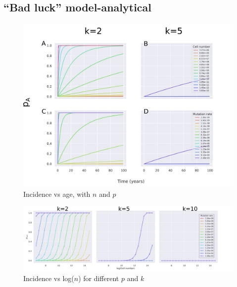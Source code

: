 \documentclass[a0,landscape]{a0poster}
\begin{document}
\begin{multicols}{3}
		\section{``Bad luck'' model-analytical}
		\setlength{\fboxsep}{15pt}
		\hspace{0.01\linewidth}
		\begin{minipage}{.5\linewidth}
			\begin{figure}[H]
				\flushright
				\includegraphics[width=\linewidth]{fig2.png}
				\caption{Incidence vs age, with $n$ and $p$}
			\end{figure}
		\end{minipage}


		\begin{minipage}{\linewidth}
		\begin{figure}[H]
			\flushright
			\includegraphics[width=\linewidth]{fig3.png}
			\caption{Incidence vs log($n$) for different $p$ and $k$}
		\end{figure}
		\end{minipage}


\end{multicols}
\end{document}
